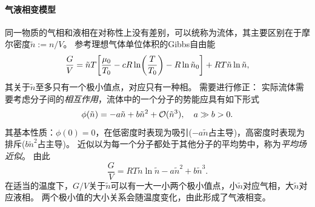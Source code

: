 \paragraph{气液相变模型}

同一物质的气相和液相在对称性上没有差别，可以统称为流体，其主要区别在于摩尔密度$\tilde n:=n/V$。
参考理想气体单位体积的Gibbs自由能
\begin{equation}
	\frac GV=\tilde nT\biggl[\frac{\mu_0}{T_0}-cR\ln\biggl(\frac T{T_0}\biggr)-R\ln\tilde n_0\biggr]+RT\tilde n\ln\tilde n,
\end{equation}
其关于$\tilde n$至多只有一个极小值点，对应只有一种相。
需要进行修正：
实际流体需要考虑分子间的\textit{相互作用}，流体中的一个分子的势能应具有如下形式
\[
	\phi(\tilde n)=-a\tilde n+b\tilde n^2+\mathcal O(\tilde n^3),\quad a\gg b>0.
\]
其基本性质：$\phi(0)=0$，在低密度时表现为吸引($-a\tilde n$占主导)，高密度时表现为排斥($b\tilde n^2$占主导)。
近似以为每一个分子都处于其他分子的平均势中，称为\textit{平均场近似}。
由此
\[
	\frac GV=RT\tilde n\ln \tilde n-a\tilde n^2+b\tilde n^3.
\]
在适当的温度下，$G/V$关于$\tilde n$可以有一大一小两个极小值点，小$\tilde n$对应气相，大$\tilde n$对应液相。
两个极小值的大小关系会随温度变化，由此形成了气液相变。

